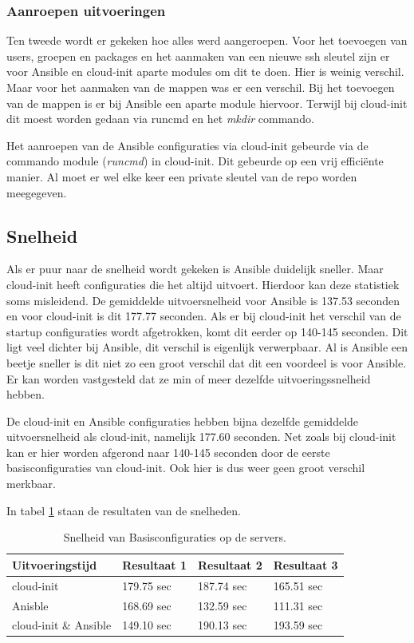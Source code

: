 \subsubsection{Aanroepen uitvoeringen}
Ten tweede wordt er gekeken hoe alles werd aangeroepen. Voor het toevoegen van users, groepen en packages en het aanmaken van een nieuwe ssh sleutel zijn er voor Ansible en cloud-init aparte modules om dit te doen. Hier is weinig verschil. Maar voor het aanmaken van de mappen was er een verschil. Bij het toevoegen van de mappen is er bij Ansible een aparte module hiervoor. Terwijl bij cloud-init dit moest worden gedaan via runcmd en het \textit{mkdir} commando. 

Het aanroepen van de Ansible configuraties via cloud-init gebeurde via de commando module (\textit{runcmd}) in cloud-init. Dit gebeurde op een vrij efficiënte manier. Al moet er wel elke keer een private sleutel van de repo worden meegegeven.

\subsection{Snelheid}
Als er puur naar de snelheid wordt gekeken is Ansible duidelijk sneller. Maar cloud-init heeft configuraties die het altijd uitvoert. Hierdoor kan deze statistiek soms misleidend. De gemiddelde uitvoersnelheid voor Ansible is 137.53 seconden en voor cloud-init is dit 177.77 seconden. Als er bij cloud-init het verschil van de startup configuraties wordt afgetrokken, komt dit eerder op 140-145 seconden. Dit ligt veel dichter bij Ansible, dit verschil is eigenlijk verwerpbaar. Al is Ansible een beetje sneller is dit niet zo een groot verschil dat dit een voordeel is voor Ansible. Er kan worden vastgesteld dat ze min of meer dezelfde uitvoeringssnelheid hebben.

De cloud-init en Ansible configuraties hebben bijna dezelfde gemiddelde uitvoersnelheid als cloud-init, namelijk 177.60 seconden. Net zoals bij cloud-init kan er hier worden afgerond naar 140-145 seconden door de eerste basisconfiguraties van cloud-init. Ook hier is dus weer geen groot verschil merkbaar.

In tabel \ref{tab:tabel resultaten basis} staan de resultaten van de snelheden.

\begin{table}[!htb]
    \centering
    \begin{tabular}{| l | l | l |l |}
        \hline
        \textbf{Uitvoeringstijd} & Resultaat 1 & Resultaat 2 & Resultaat 3   \\ \hline
        cloud-init & 179.75 sec & 187.74 sec & 165.51 sec  \\ \hline
        Anisble & 168.69 sec & 132.59 sec & 111.31 sec \\ \hline
        cloud-init \& Ansible & 149.10 sec & 190.13 sec & 193.59 sec \\
        \hline
    \end{tabular}
    \caption{Snelheid van Basisconfiguraties op de servers.}
    \label{tab:tabel resultaten basis}
\end{table}

